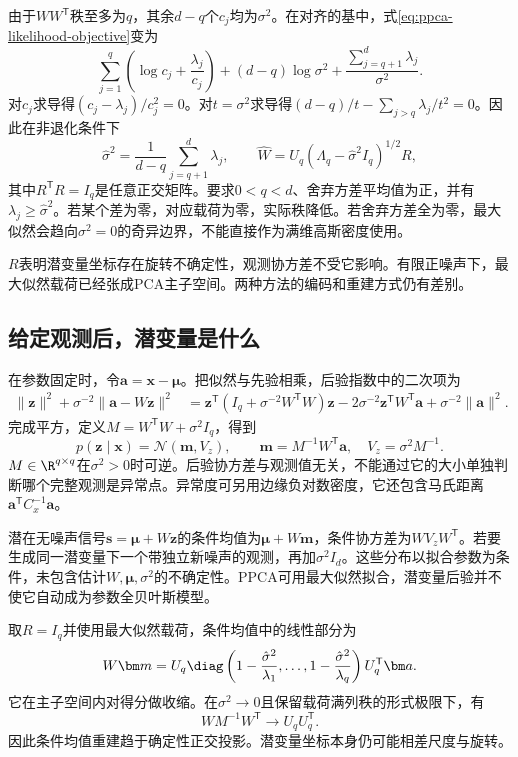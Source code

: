 由于$WW^{\mathsf T}$秩至多为$q$，其余$d-q$个$c_j$均为$\sigma^2$。在对齐的基中，式\eqref{eq:ppca-likelihood-objective}变为
\begin{equation}
 \sum_{j=1}^q\left(\log c_j+\frac{\lambda_j}{c_j}\right)
 +(d-q)\log\sigma^2+\frac{\sum_{j=q+1}^d\lambda_j}{\sigma^2}.
\end{equation}
对$c_j$求导得$(c_j-\lambda_j)/c_j^2=0$。对$t=\sigma^2$求导得$(d-q)/t-\sum_{j>q}\lambda_j/t^2=0$。因此在非退化条件下
\begin{equation}
 \hat\sigma^2=\frac1{d-q}\sum_{j=q+1}^d\lambda_j,\qquad
 \hat W=U_q(\Lambda_q-\hat\sigma^2I_q)^{1/2}R,
 \label{eq:ppca-ml-solution}
\end{equation}
其中$R^{\mathsf T}R=I_q$是任意正交矩阵。要求$0<q<d$、舍弃方差平均值为正，并有$\lambda_j\ge\hat\sigma^2$。若某个差为零，对应载荷为零，实际秩降低。若舍弃方差全为零，最大似然会趋向$\sigma^2=0$的奇异边界，不能直接作为满维高斯密度使用。

$R$表明潜变量坐标存在旋转不确定性，观测协方差不受它影响。有限正噪声下，最大似然载荷已经张成PCA主子空间。两种方法的编码和重建方式仍有差别。

\subsection{给定观测后，潜变量是什么}
在参数固定时，令$\bm a=\bm x-\bm\mu$。把似然与先验相乘，后验指数中的二次项为
\begin{align}
 \|\bm z\|^2+\sigma^{-2}\|\bm a-W\bm z\|^2
 &=\bm z^{\mathsf T}(I_q+\sigma^{-2}W^{\mathsf T}W)\bm z
 -2\sigma^{-2}\bm z^{\mathsf T}W^{\mathsf T}\bm a
 +\sigma^{-2}\|\bm a\|^2.
\end{align}
完成平方，定义$M=W^{\mathsf T}W+\sigma^2I_q$，得到
\begin{equation}
 p(\bm z\mid\bm x)=\mathcal N(\bm m,V_z),\qquad
 \bm m=M^{-1}W^{\mathsf T}\bm a,\quad
 V_z=\sigma^2M^{-1}.
 \label{eq:ppca-posterior}
\end{equation}
$M\in\R^{q\times q}$在$\sigma^2>0$时可逆。后验协方差与观测值无关，不能通过它的大小单独判断哪个完整观测是异常点。异常度可另用边缘负对数密度，它还包含马氏距离$\bm a^{\mathsf T}C_x^{-1}\bm a$。

潜在无噪声信号$\bm s=\bm\mu+W\bm z$的条件均值为$\bm\mu+W\bm m$，条件协方差为$WV_zW^{\mathsf T}$。若要生成同一潜变量下一个带独立新噪声的观测，再加$\sigma^2I_d$。这些分布以拟合参数为条件，未包含估计$W,\bm\mu,\sigma^2$的不确定性。PPCA可用最大似然拟合，潜变量后验并不使它自动成为参数全贝叶斯模型。

取$R=I_q$并使用最大似然载荷，条件均值中的线性部分为
\begin{equation}
 W\bm m=U_q\diag\left(1-\frac{\hat\sigma^2}{\lambda_1},\ldots,
 1-\frac{\hat\sigma^2}{\lambda_q}\right)U_q^{\mathsf T}\bm a.
 \label{eq:ppca-shrinkage}
\end{equation}
它在主子空间内对得分做收缩。在$\sigma^2\to0$且保留载荷满列秩的形式极限下，有
\begin{equation}
 WM^{-1}W^{\mathsf T}\longrightarrow U_qU_q^{\mathsf T}.
\end{equation}
因此条件均值重建趋于确定性正交投影。潜变量坐标本身仍可能相差尺度与旋转。


